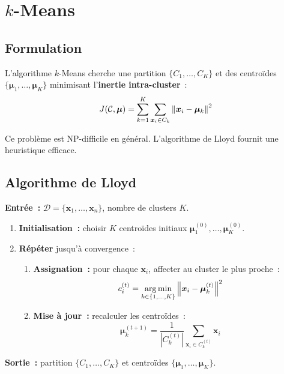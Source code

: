 \section{$k$-Means}
\label{sec:kmeans}

\subsection{Formulation}

\begin{definition}[$k$-Means]
L'algorithme $k$-Means cherche une partition $\{C_1, \ldots, C_K\}$ et des
centro\"ides $\{\bm{\mu}_1, \ldots, \bm{\mu}_K\}$ minimisant l'\textbf{inertie
intra-cluster}~:
\begin{equation}
  J(\mathcal{C}, \bm{\mu}) = \sum_{k=1}^K \sum_{\bm{x}_i \in C_k}
  \left\| \bm{x}_i - \bm{\mu}_k \right\|^2
  \label{eq:kmeans-obj}
\end{equation}
\end{definition}

Ce probl\`eme est NP-difficile en g\'en\'eral. L'algorithme de Lloyd fournit
une heuristique efficace.

\subsection{Algorithme de Lloyd}

\begin{algorithme}[title=\textbf{$k$-Means (Lloyd)}]
\textbf{Entr\'ee~:} $\mathcal{D} = \{\bm{x}_1, \ldots, \bm{x}_n\}$, nombre
de clusters $K$.

\begin{enumerate}
  \item \textbf{Initialisation~:} choisir $K$ centro\"ides initiaux
    $\bm{\mu}_1^{(0)}, \ldots, \bm{\mu}_K^{(0)}$.
  \item \textbf{R\'ep\'eter} jusqu'\`a convergence~:
    \begin{enumerate}
      \item \textbf{Assignation~:} pour chaque $\bm{x}_i$, affecter au cluster
        le plus proche~:
        \begin{equation}
          c_i^{(t)} = \operatorname*{arg\,min}_{k \in \{1, \ldots, K\}} \left\| \bm{x}_i - \bm{\mu}_k^{(t)} \right\|^2
        \end{equation}
      \item \textbf{Mise \`a jour~:} recalculer les centro\"ides~:
        \begin{equation}
          \bm{\mu}_k^{(t+1)} = \frac{1}{|C_k^{(t)}|} \sum_{\bm{x}_i \in C_k^{(t)}} \bm{x}_i
        \end{equation}
    \end{enumerate}
\end{enumerate}
\textbf{Sortie~:} partition $\{C_1, \ldots, C_K\}$ et centro\"ides
$\{\bm{\mu}_1, \ldots, \bm{\mu}_K\}$.
\end{algorithme}


